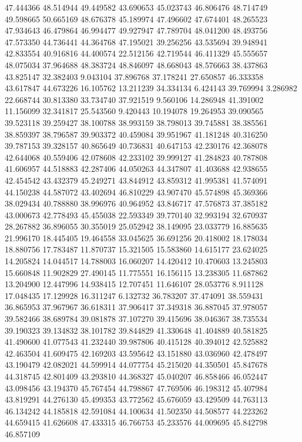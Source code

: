 47.444366
48.514944
49.449582
43.690653
45.023743
46.806476
48.714749
49.598665
50.665169
48.676378
45.189974
47.496602
47.674401
48.265523
47.934643
46.479864
46.994477
49.927947
47.789704
48.041200
48.493756
47.573350
44.736441
44.364768
47.195021
39.256256
43.535694
39.948941
42.833554
40.916816
44.400574
22.512156
42.719544
46.411329
45.555657
48.075034
37.964688
48.383724
48.846097
48.668043
48.576663
38.437863
43.825147
32.382403
9.043104
37.896768
37.178241
27.650857
46.333358
43.617847
44.673226
16.105762
13.211239
34.334134
6.424143
39.769994
3.286982
22.668744
30.813380
33.734740
37.921519
9.560106
14.286948
41.391002
11.156099
32.341817
25.543560
9.420443
10.194078
19.264953
39.090565
39.523118
39.259427
38.100788
38.993159
38.798013
39.745881
38.385561
38.859397
38.796587
39.903372
40.459084
39.951967
41.181248
40.316250
39.787153
39.328157
40.865649
40.736831
40.647153
42.230176
42.368078
42.644068
40.559406
42.078608
42.233102
39.999127
41.284823
40.787808
41.606957
44.518883
42.287406
44.050263
44.347807
41.403688
42.938655
42.454542
43.432379
45.249271
43.844912
43.859312
41.995381
41.574091
44.150238
44.587072
43.402694
46.810229
43.907470
45.574898
45.369366
38.029434
40.788880
38.996976
40.964952
43.846717
47.576873
37.385182
43.000673
42.778493
45.455038
22.593349
39.770140
32.993194
32.670937
28.267882
36.896055
30.355019
25.052942
38.149095
23.033779
16.885635
21.996170
18.445405
19.464558
33.045625
36.691256
20.418002
18.178034
18.880756
17.783487
11.870737
15.321505
15.583860
14.615177
23.624025
14.205824
14.044517
14.788003
16.060207
14.420412
10.470603
13.245803
15.660848
11.902829
27.490145
11.775551
16.156115
13.238305
11.687862
13.204900
12.447996
14.938415
12.707451
11.646107
28.053776
8.911128
17.048435
17.129928
16.311247
6.132732
36.783207
37.474091
38.559431
36.865953
37.967967
36.618311
37.906417
37.349318
36.887045
37.978057
39.582466
38.689784
39.081878
37.107270
39.415696
38.046367
38.735534
39.190323
39.134832
38.101782
39.844829
41.330648
41.404889
40.581825
41.490600
41.077543
41.232440
39.987806
40.415128
40.394012
42.525882
42.463504
41.609475
42.169203
43.595642
43.151880
43.036960
42.478497
43.190479
42.082021
44.599914
44.077754
45.215020
44.350501
45.847678
44.318745
42.801409
43.293810
44.368327
45.040207
46.858466
46.052447
43.098456
43.194370
45.767454
44.798867
47.769506
46.198312
45.407984
43.819291
44.276130
45.499353
43.772562
45.676059
43.429509
44.763113
46.134242
44.185818
42.591084
44.100634
41.502350
44.508577
44.223262
44.659415
41.626608
47.433315
46.766753
45.233576
44.009695
45.842798
46.857109
